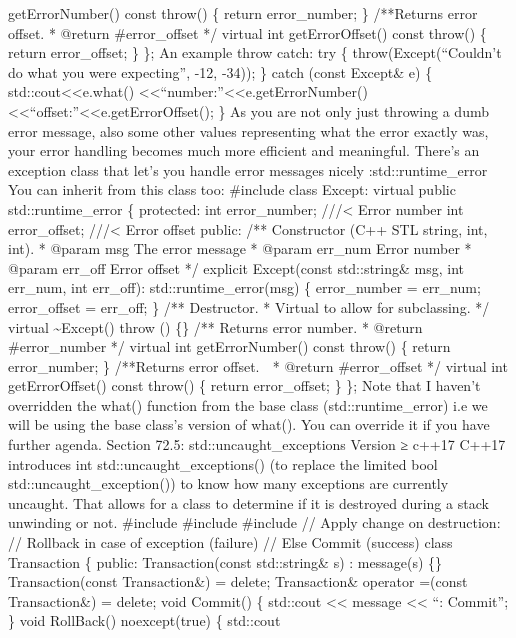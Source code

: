 getErrorNumber() const throw() \{ return error\_number; \} /**Returns
error offset. * @return \#error\_offset */ virtual int getErrorOffset()
const throw() \{  return error\_offset; \} \}; An example throw catch:
try \{ throw(Except(``Couldn't do what you were expecting'', -12, -34));
\} catch (const Except\& e) \{ std::cout\textless\textless e.what()
\textless\textless{}``\nError number:''\textless\textless e.getErrorNumber()
\textless\textless{}``\nError offset:''\textless\textless e.getErrorOffset();
\} As you are not only just throwing a dumb error message, also some
other values representing what the error exactly was, your error
handling becomes much more eﬃcient and meaningful. There's an exception
class that let's you handle error messages nicely :std::runtime\_error
You can inherit from this class too: \#include class Except: virtual
public std::runtime\_error \{ protected: int error\_number;
///\textless{} Error number int error\_offset; ///\textless{} Error
offset public: /** Constructor (C++ STL string, int, int). * @param msg
The error message * @param err\_num Error number * @param err\_off Error
offset */ explicit Except(const std::string\& msg, int err\_num, int
err\_off): std::runtime\_error(msg) \{ error\_number = err\_num;
error\_offset = err\_off; \} /** Destructor. * Virtual to allow for
subclassing. */ virtual \textasciitilde Except() throw () \{\} /**
Returns error number. * @return \#error\_number */ virtual int
getErrorNumber() const throw() \{ return error\_number; \} /**Returns
error offset.  * @return \#error\_offset */ virtual int
getErrorOffset() const throw() \{ return error\_offset; \} \}; Note that
I haven't overridden the what() function from the base class
(std::runtime\_error) i.e we will be using the base class's version of
what(). You can override it if you have further agenda. Section 72.5:
std::uncaught\_exceptions Version ≥ c++17 C++17 introduces int
std::uncaught\_exceptions() (to replace the limited bool
std::uncaught\_exception()) to know how many exceptions are currently
uncaught. That allows for a class to determine if it is destroyed during
a stack unwinding or not. \#include \#include \#include // Apply change
on destruction: // Rollback in case of exception (failure) // Else
Commit (success) class Transaction \{ public: Transaction(const
std::string\& s) : message(s) \{\} Transaction(const Transaction\&) =
delete; Transaction\& operator =(const Transaction\&) = delete; void
Commit() \{ std::cout \textless\textless{} message \textless\textless{}
``: Commit\n''; \} void RollBack() noexcept(true) \{ std::cout
